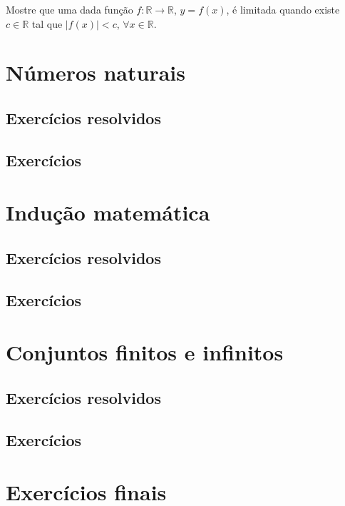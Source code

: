 \begin{exer}
  Mostre que uma dada função $f:\mathbb{R}\to\mathbb{R}$, $y = f(x)$, é limitada quando existe $c\in\mathbb{R}$ tal que $|f(x)|<c$, $\forall x\in\mathbb{R}$.
\end{exer}
\begin{resp}
  \construirResp
\end{resp}


\section{Números naturais}\label{sec:numeros_naturais}

\construirSec

\subsection*{Exercícios resolvidos}

\construirExeresol

\subsection*{Exercícios}

\construirExer

\section{Indução matemática}\label{sec:inducao_matematica}

\construirSec

\subsection*{Exercícios resolvidos}

\construirExeresol

\subsection*{Exercícios}

\construirExer

\section{Conjuntos finitos e infinitos}\label{sec:conjuntos_finitos_e_infinitos}

\construirSec

\subsection*{Exercícios resolvidos}

\construirExeresol

\subsection*{Exercícios}

\construirExer

\section{Exercícios finais}

\construirExer


